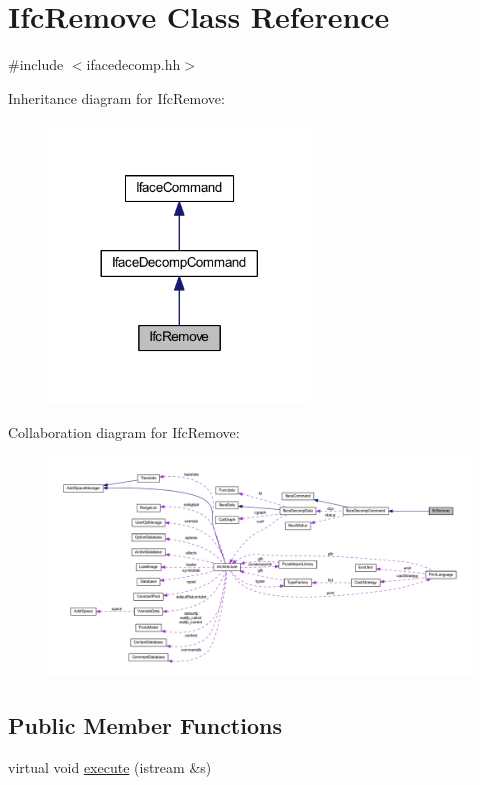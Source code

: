 \hypertarget{class_ifc_remove}{}\section{Ifc\+Remove Class Reference}
\label{class_ifc_remove}


{\ttfamily \#include $<$ifacedecomp.\+hh$>$}



Inheritance diagram for Ifc\+Remove\+:
\nopagebreak
\begin{figure}[H]
\begin{center}
\leavevmode
\includegraphics[width=197pt]{class_ifc_remove__inherit__graph}
\end{center}
\end{figure}


Collaboration diagram for Ifc\+Remove\+:
\nopagebreak
\begin{figure}[H]
\begin{center}
\leavevmode
\includegraphics[width=350pt]{class_ifc_remove__coll__graph}
\end{center}
\end{figure}
\subsection*{Public Member Functions}
\begin{DoxyCompactItemize}
\item 
virtual void \mbox{\hyperlink{class_ifc_remove_a170d67940736747f8043483426214f54}{execute}} (istream \&s)
\end{DoxyCompactItemize}
